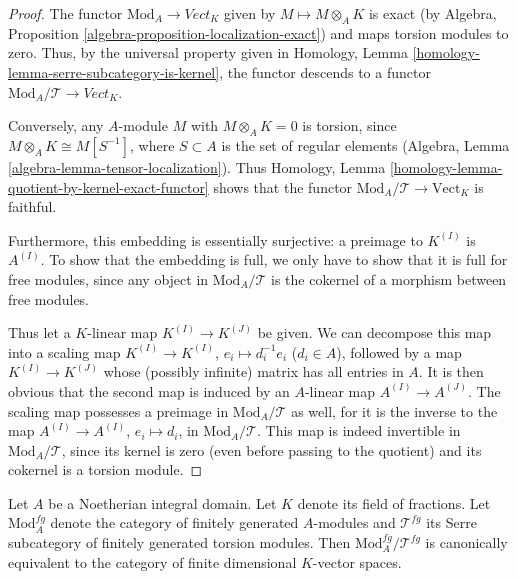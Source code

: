 \begin{proof}
The functor $\text{Mod}_A \to \textit{Vect}_K$ given by $M
\mapsto M \otimes_A K$ is exact (by Algebra, Proposition
\ref{algebra-proposition-localization-exact}) and maps torsion modules to zero.
Thus, by the universal property given in Homology, Lemma
\ref{homology-lemma-serre-subcategory-is-kernel}, the functor descends to a
functor $\text{Mod}_A/\mathcal{T} \to \textit{Vect}_K$.

\medskip\noindent
Conversely, any $A$-module $M$ with $M \otimes_A K = 0$ is torsion, since
$M \otimes_A K \cong M[S^{-1}]$, where $S \subset A$ is the set of regular
elements (Algebra, Lemma \ref{algebra-lemma-tensor-localization}). Thus
Homology, Lemma \ref{homology-lemma-quotient-by-kernel-exact-functor}
shows that the functor
$\text{Mod}_A/\mathcal{T} \to \text{Vect}_K$ is faithful.

\medskip\noindent
Furthermore, this embedding is essentially surjective: a preimage to
$K^{(I)}$ is $A^{(I)}$. To show that the embedding is full, we only have
to show that it is full for free modules, since any object in
$\text{Mod}_A/\mathcal{T}$ is the cokernel of a morphism between free modules.

\medskip\noindent
Thus let a $K$-linear map $K^{(I)} \to K^{(J)}$ be given. We can decompose
this map into a scaling map $K^{(I)} \to K^{(I)}$, $e_i \mapsto d_i^{-1} e_i$
($d_i \in A$), followed by a map $K^{(I)} \to K^{(J)}$ whose
(possibly infinite) matrix
has all entries in $A$. It is then obvious that the second map is induced by an
$A$-linear map $A^{(I)} \to A^{(J)}$. The scaling map possesses a preimage in
$\text{Mod}_A/\mathcal{T}$ as well, for it is the inverse to the map
$A^{(I)} \to A^{(I)}$, $e_i \mapsto d_i$, in $\text{Mod}_A/\mathcal{T}$.
This map is indeed invertible in $\text{Mod}_A/\mathcal{T}$, since its kernel
is zero (even before passing to the quotient) and its cokernel is a torsion
module.
\end{proof}

\begin{proposition}
\label{proposition-quotient-by-finitely-generated-torsion-modules}
Let $A$ be a Noetherian integral domain. Let $K$ denote its field of fractions.
Let $\text{Mod}_A^{fg}$ denote the category of finitely generated $A$-modules
and $\mathcal{T}^{fg}$ its Serre subcategory of finitely generated torsion
modules. Then $\text{Mod}_A^{fg}/\mathcal{T}^{fg}$ is canonically equivalent
to the category of finite dimensional $K$-vector spaces.
\end{proposition}

